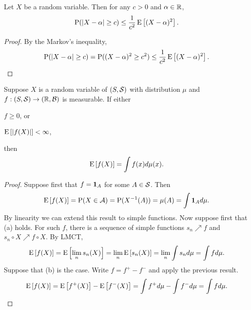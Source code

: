 \begin{corollary}
    Let $X$ be a random variable. Then for any $c>0$ and $\alpha\in\R$, 
    \begin{equation*}
        \P(\abs{X - \alpha}\geq c) \leq \frac{1}{c^2}\E\sbrc{(X-\alpha)^2}.
    \end{equation*}
\end{corollary}
\begin{proof}
    By the Markov's inequality,
    \begin{equation*}
        \P(\abs{X - \alpha}\geq c) = \P((X-\alpha)^2\geq c^2) \leq \frac{1}{c^2}\E\sbrc{(X-\alpha)^2}.
    \end{equation*}
\end{proof}

\begin{theorem}
    Suppose $X$ is a random variable of $(S,\S)$ with distribution $\mu$ and 
    $f:(S,\S)\to(\R,\B)$ is measurable. If either 
    \begin{thmenum}
        \item $f\geq 0$, or 
        \item $\E\sbrc{\abs{f(X)}}<\infty$, 
    \end{thmenum} 
    then 
    \begin{equation*}
        \E\sbrc{f(X)} = \int f(x)d\mu(x).
    \end{equation*}
\end{theorem}
\begin{proof}
    Suppose first that $f = \one_A$ for some $A\in\S$. Then 
    \begin{equation*}
        \E\sbrc{f(X)} = \P(X\in\A) = \P(X^{-1}(A)) = \mu(A) = \int \one_Ad\mu.
    \end{equation*}
    By linearity we can extend this result to simple functions. Now suppose 
    first that (a) holds. For such $f$, there is a sequence of simple functions 
    $s_n\nearrow f$ and $s_n\circ X\nearrow f\circ X$. By LMCT, 
    \begin{equation*}
        \E\sbrc{f(X)} = \E\sbrc{\lim_n s_n(X)} = \lim_n\E\sbrc{s_n(X)} 
        = \lim_n\int s_nd\mu = \int fd\mu. 
    \end{equation*}
    Suppose that (b) is the case. Write $f = f^+ - f^-$ and apply the previous 
    result. 
    \begin{equation*}
        \E\sbrc{f(X)} = \E\sbrc{f^+(X)} - \E\sbrc{f^-(X)} 
        = \int f^+d\mu - \int f^-d\mu = \int fd\mu. 
    \end{equation*}
\end{proof}

